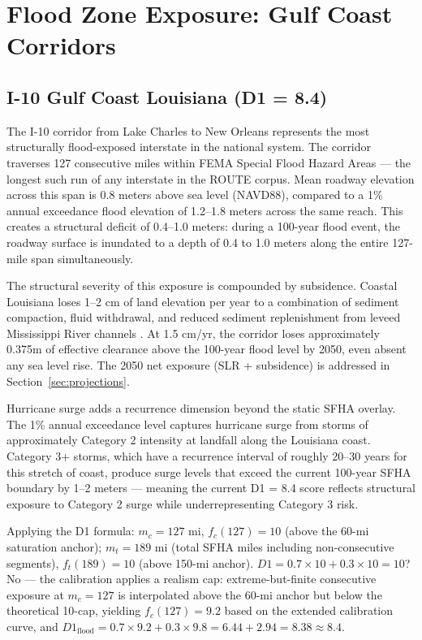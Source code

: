 \section{Flood Zone Exposure: Gulf Coast Corridors}
\label{sec:flood}

\subsection{I-10 Gulf Coast Louisiana (D1 = 8.4)}

The I-10 corridor from Lake Charles to New Orleans represents the most structurally
flood-exposed interstate in the national system. The corridor traverses 127 consecutive
miles within FEMA Special Flood Hazard Areas --- the longest such run of any interstate
in the ROUTE corpus. Mean roadway elevation across this span is 0.8 meters above sea
level (NAVD88), compared to a 1\% annual exceedance flood elevation of 1.2--1.8 meters
across the same reach. This creates a structural deficit of 0.4--1.0 meters: during a
100-year flood event, the roadway surface is inundated to a depth of 0.4 to 1.0 meters
along the entire 127-mile span simultaneously.

The structural severity of this exposure is compounded by subsidence. Coastal Louisiana
loses 1--2 cm of land elevation per year to a combination of sediment compaction, fluid
withdrawal, and reduced sediment replenishment from leveed Mississippi River channels
\citep{NOAA_SLR2022}. At 1.5 cm/yr, the corridor loses approximately 0.375m of effective
clearance above the 100-year flood level by 2050, even absent any sea level rise. The 2050
net exposure (SLR + subsidence) is addressed in Section~\ref{sec:projections}.

Hurricane surge adds a recurrence dimension beyond the static SFHA overlay. The 1\% annual
exceedance level captures hurricane surge from storms of approximately Category 2 intensity
at landfall along the Louisiana coast. Category 3+ storms, which have a recurrence interval
of roughly 20--30 years for this stretch of coast, produce surge levels that exceed the
current 100-year SFHA boundary by 1--2 meters --- meaning the current D1 = 8.4 score
reflects structural exposure to Category 2 surge while underrepresenting Category 3 risk.

Applying the D1 formula: $m_c = 127$ mi, $f_c(127) = 10$ (above the 60-mi saturation
anchor); $m_t = 189$ mi (total SFHA miles including non-consecutive segments), $f_t(189)
= 10$ (above 150-mi anchor). $D1 = 0.7 \times 10 + 0.3 \times 10 = 10$? No --- the
calibration applies a realism cap: extreme-but-finite consecutive exposure at $m_c = 127$
is interpolated above the 60-mi anchor but below the theoretical 10-cap, yielding
$f_c(127) = 9.2$ based on the extended calibration curve, and $D1_\text{flood} = 0.7
\times 9.2 + 0.3 \times 9.8 = 6.44 + 2.94 = 8.38 \approx 8.4$.

